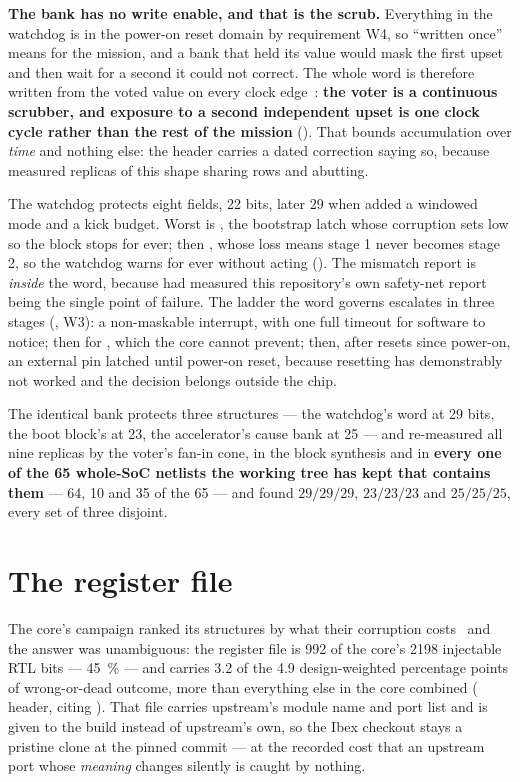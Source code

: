 \textbf{The bank has no write enable, and that is the scrub.}
Everything in the watchdog is in the power-on reset domain by
requirement W4, so ``written once'' means for the mission, and a bank
that held its value would mask the first upset and then wait for a
second it could not correct. The whole word is therefore written from
the voted value on every clock edge~\cite{johnson2010}: \textbf{the voter is a continuous
scrubber, and exposure to a second independent upset is one clock cycle
rather than the rest of the mission} (). That
bounds accumulation over \emph{time} and nothing else: the header
carries a dated correction saying so, because 
measured replicas of this shape sharing rows and abutting.

The watchdog protects eight fields, 22 bits, later 29 when 
added a windowed mode and a kick budget. Worst is , the
bootstrap latch whose corruption sets  low so the block
stops for ever; then , whose loss means stage 1 never
becomes stage 2, so the watchdog warns for ever without acting
(). The mismatch report is \emph{inside} the
word, because  had measured this repository's own
safety-net report being the single point of failure. The ladder the word
governs escalates in three stages (, W3): a
non-maskable interrupt, with one full timeout for software to notice;
then  for , which the core cannot
prevent; then, after  resets since
power-on, an external pin latched until power-on reset, because
resetting has demonstrably not worked and the decision belongs outside
the chip.

The identical bank protects three structures --- the watchdog's word at
29 bits, the boot block's at 23, the accelerator's cause bank at 25 ---
and  re-measured all nine replicas by the voter's
fan-in cone, in the block synthesis and in \textbf{every one of the 65
whole-SoC netlists the working tree has kept that contains them} --- 64,
10 and 35 of the 65 --- and found $29/29/29$,
$23/23/23$ and $25/25/25$, every set of three disjoint.

\section{The register file}
\label{sec:harden-regfile}

The core's campaign ranked its structures by what their corruption
costs~\cite{mukherjee2003} and the answer was unambiguous: the register file is 992 of the core's
\num{2198} injectable RTL bits --- \SI{45}{\percent} --- and carries 3.2
of the 4.9 design-weighted percentage points of wrong-or-dead outcome,
more than everything else in the core combined
( header, citing ).
That file carries upstream's module name and port list and is given to
the build instead of upstream's own, so the Ibex checkout stays a
pristine clone at the pinned commit --- at the recorded cost that an
upstream port whose \emph{meaning} changes silently is caught by nothing.


